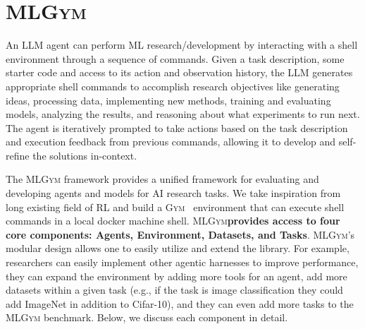 \documentclass[]{fairmeta}
\newcommand{\dn}[1]{\colorbox{magenta}{\textcolor{white}{Deepak}}\textcolor{magenta}{\textbf{:#1}}}
\newcommand{\rr}[1]{\colorbox{red}{\textcolor{white}{Roberta}}\textcolor{red}{\textbf{:#1}}}
\newcommand{\mlgym}{\fontfamily{lmr}\selectfont\mdseries\textsc{MLGym}\xspace}
\begin{document}




\section{\mlgym}

An LLM agent can perform ML research/development by interacting with a shell environment through a sequence of commands.
%
Given a task description, some starter code and access to its action and observation history, the LLM generates appropriate shell commands to accomplish research objectives like generating ideas, processing data, implementing new methods, training and evaluating models, analyzing the results, and reasoning about what experiments to run next.
%
The agent is iteratively prompted to take actions based on the task description and execution feedback from previous commands, allowing it to develop and self-refine the solutions in-context.
%

The \mlgym framework provides a unified framework for evaluating and developing agents and models for AI research tasks. We take inspiration from long existing field of RL and build a \textsc{Gym}~\citep{brockman2016openaigym} environment that can execute shell commands in a local docker machine shell. 
\mlgym \textbf{provides access to four core components: Agents, Environment, Datasets, and Tasks}. \mlgym's modular design allows one to easily utilize and extend the library.
For example, researchers can easily implement other agentic harnesses to improve performance, they can expand the environment by adding more tools for an agent, add more datasets within a given task (e.g., if the task is image classification they could add ImageNet in addition to Cifar-10), and they can even add more tasks to the \mlgym benchmark. Below, we discuss each component in detail.
\end{document}
